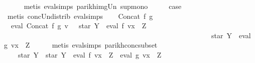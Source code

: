 \begin{isabellebody}
\ \ \ \ \isamarkupfalse%
\ {\isacharparenleft}{\kern0pt}metis\ eval{\isachardot}{\kern0pt}simps{\isacharparenleft}{\kern0pt}{}{\isacharparenright}{\kern0pt}\ parikh{\isacharunderscore}{\kern0pt}img{\isacharunderscore}{\kern0pt}Un\ sup{\isachardot}{\kern0pt}mono{\isacharparenright}{\kern0pt}\isanewline
\ \ \isamarkupfalse%
\ \isamarkupfalse%
\ {\isacharquery}{\kern0pt}case\ \isamarkupfalse%
\ {\isacharparenleft}{\kern0pt}metis\ conc{\isacharunderscore}{\kern0pt}Un{\isacharunderscore}{\kern0pt}distrib{\isacharparenleft}{\kern0pt}{}{\isacharparenright}{\kern0pt}\ eval{\isachardot}{\kern0pt}simps{\isacharparenleft}{\kern0pt}{}{\isacharparenright}{\kern0pt}{\isacharparenright}{\kern0pt}\isanewline
{}\isamarkupfalse%
\isanewline
\ \ \isamarkupfalse%
\ {\isacharparenleft}{\kern0pt}Concat\ f\ g{\isacharparenright}{\kern0pt}\isanewline
\ \ \isamarkupfalse%
\ \isamarkupfalse%
\ {\isachardoublequoteopen}{\isasymPsi}\ {\isacharparenleft}{\kern0pt}eval\ {\isacharparenleft}{\kern0pt}Concat\ f\ g{\isacharparenright}{\kern0pt}\ v{\isacharparenright}{\kern0pt}\ {\isasymsubseteq}\ {\isasymPsi}\ {\isacharparenleft}{\kern0pt}{\isacharparenleft}{\kern0pt}star\ Y\ {\isacharat}{\kern0pt}{\isacharat}{\kern0pt}\ eval\ f\ {\isacharparenleft}{\kern0pt}v{\isacharparenleft}{\kern0pt}x\ {\isacharcolon}{\kern0pt}{\isacharequal}{\kern0pt}\ Z{\isacharparenright}{\kern0pt}{\isacharparenright}{\kern0pt}{\isacharparenright}{\kern0pt}\isanewline
\ \ \ \ \ \ \ \ \ \ \ \ \ \ \ \ \ \ \ \ \ \ \ \ \ \ \ \ \ \ \ \ \ \ \ \ \ \ \ \ \ \ \ \ \ \ \ \ \ \ \ \ \ \ \ \ \ \ {\isacharat}{\kern0pt}{\isacharat}{\kern0pt}\ star\ Y\ {\isacharat}{\kern0pt}{\isacharat}{\kern0pt}\ eval\ g\ {\isacharparenleft}{\kern0pt}v{\isacharparenleft}{\kern0pt}x\ {\isacharcolon}{\kern0pt}{\isacharequal}{\kern0pt}\ Z{\isacharparenright}{\kern0pt}{\isacharparenright}{\kern0pt}{\isacharparenright}{\kern0pt}{\isachardoublequoteclose}\isanewline
\ \ \ \ \isamarkupfalse%
\ {\isacharparenleft}{\kern0pt}metis\ eval{\isachardot}{\kern0pt}simps{\isacharparenleft}{\kern0pt}{}{\isacharparenright}{\kern0pt}\ parikh{\isacharunderscore}{\kern0pt}conc{\isacharunderscore}{\kern0pt}subset{\isacharparenright}{\kern0pt}\isanewline
\ \ \isamarkupfalse%
\ \isamarkupfalse%
\ {\isachardoublequoteopen}{\isasymdots}\ {\isacharequal}{\kern0pt}\ {\isasymPsi}\ {\isacharparenleft}{\kern0pt}star\ Y\ {\isacharat}{\kern0pt}{\isacharat}{\kern0pt}\ star\ Y\ {\isacharat}{\kern0pt}{\isacharat}{\kern0pt}\ eval\ f\ {\isacharparenleft}{\kern0pt}v{\isacharparenleft}{\kern0pt}x\ {\isacharcolon}{\kern0pt}{\isacharequal}{\kern0pt}\ Z{\isacharparenright}{\kern0pt}{\isacharparenright}{\kern0pt}\ {\isacharat}{\kern0pt}{\isacharat}{\kern0pt}\ eval\ g\ {\isacharparenleft}{\kern0pt}v{\isacharparenleft}{\kern0pt}x\ {\isacharcolon}{\kern0pt}{\isacharequal}{\kern0pt}\ Z{\isacharparenright}{\kern0pt}{\isacharparenright}{\kern0pt}{\isacharparenright}{\kern0pt}{\isachardoublequoteclose}\isanewline

\end{isabellebody}
